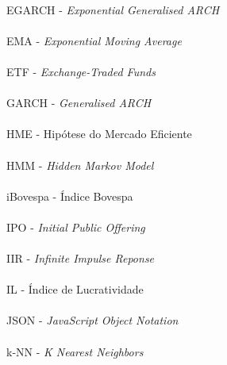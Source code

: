 \paragraph{}EGARCH - \textit{Exponential Generalised ARCH}
\paragraph{}EMA - \textit{Exponential Moving Average}
\paragraph{}ETF - \textit{Exchange-Traded Funds}
\paragraph{}GARCH - \textit{Generalised ARCH}
\paragraph{}HME - Hipótese do Mercado Eficiente
\paragraph{}HMM - \textit{Hidden Markov Model}
\paragraph{}iBovespa - Índice Bovespa
\paragraph{}IPO - \textit{Initial Public Offering}
\paragraph{}IIR - \textit{Infinite Impulse Reponse}
\paragraph{}IL - Índice de Lucratividade
\paragraph{}JSON - \textit{JavaScript Object Notation}
\paragraph{}k-NN - \textit{K Nearest Neighbors}
